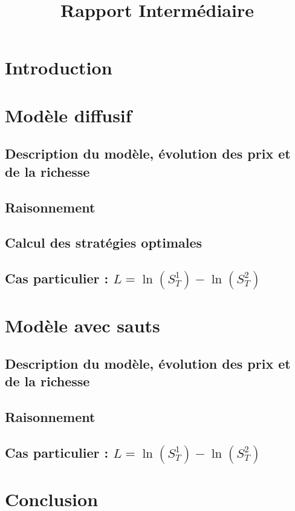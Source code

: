 \documentclass[11pt,letterpaper]{article}
\title{Rapport Intermédiaire}
\begin{document}



\pagebreak
\tableofcontents
\pagebreak

\section{Introduction}



\pagebreak
\section{Modèle diffusif}
%
\subsection{Description du modèle, évolution des prix et de la richesse}

\subsection{Raisonnement}

\subsection{Calcul des stratégies optimales}

\subsection{Cas particulier : $L = \ln \left( S_T^{1} \right) - \ln \left( S_T^{2} \right)$} \label{section_1_4}
 


\pagebreak
\section{Modèle avec sauts}
\subsection{Description du modèle, évolution des prix et de la richesse}

\subsection{Raisonnement}

\subsection{Cas particulier : $L = \ln \left( S_T^{1} \right) - \ln \left( S_T^{2} \right)$}



\pagebreak
\section{Conclusion}


\pagebreak
\nocite{*}


\end{document}
